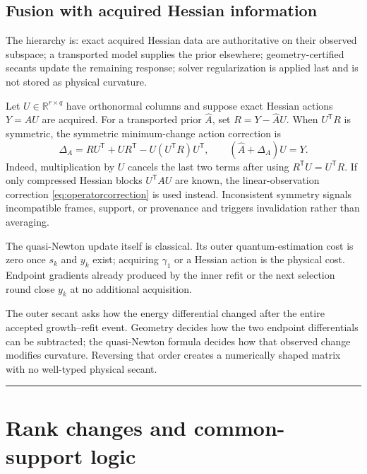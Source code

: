 \documentclass[10pt,twocolumn]{article}
\theoremstyle{definition}
\theoremstyle{remark}
\newcommand{\conceptbreak}{\par\vspace{0.45em}\noindent\textcolor{navy!55}{\rule{\columnwidth}{0.35pt}}\vspace{0.35em}\par}
\newcommand{\R}{\mathbb R}
\begin{document}
\subsection{Fusion with acquired Hessian information}

The hierarchy is: exact acquired Hessian data are authoritative on their observed subspace; a transported model supplies the prior elsewhere; geometry-certified secants update the remaining response; solver regularization is applied last and is not stored as physical curvature.

Let $U\in\R^{r\times q}$ have orthonormal columns and suppose exact Hessian actions $Y=A U$ are acquired.  For a transported prior $\widehat A$, set $R=Y-\widehat A U$.  When $U^{\mathsf T}R$ is symmetric, the symmetric minimum-change action correction is
\begin{equation}
 \Delta_A=RU^{\mathsf T}+UR^{\mathsf T}-U(U^{\mathsf T}R)U^{\mathsf T},\qquad
 (\widehat A+\Delta_A)U=Y.
 \label{eq:hessianfusion}
\end{equation}
Indeed, multiplication by $U$ cancels the last two terms after using $R^{\mathsf T}U=U^{\mathsf T}R$.  If only compressed Hessian blocks $U^{\mathsf T}AU$ are known, the linear-observation correction \eqref{eq:operatorcorrection} is used instead.  Inconsistent symmetry signals incompatible frames, support, or provenance and triggers invalidation rather than averaging.

The quasi-Newton update itself is classical.  Its outer quantum-estimation cost is zero once $s_k$ and $y_k$ exist; acquiring $\gamma_1$ or a Hessian action is the physical cost.  Endpoint gradients already produced by the inner refit or the next selection round close $y_k$ at no additional acquisition.

\begin{physbox}
The outer secant asks how the energy differential changed after the entire accepted growth--refit event.  Geometry decides how the two endpoint differentials can be subtracted; the quasi-Newton formula decides how that observed change modifies curvature.  Reversing that order creates a numerically shaped matrix with no well-typed physical secant.
\end{physbox}

\conceptbreak

\section{Rank changes and common-support logic}
\label{sec:rank}
\end{document}
